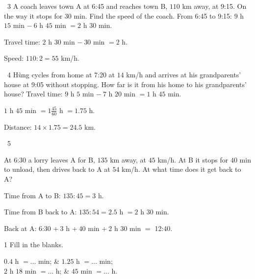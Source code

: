 \gap
\begin{exbox}{\ExWord\ 3}
A coach leaves town A at 6:45 and reaches town B, $110$ km away, at 9:15. On the way it stops for $30$ min. Find the speed of the coach.
\guide
From 6:45 to 9:15: $9$ h $15$ min $-\ 6$ h $45$ min $=2$ h $30$ min.\par
Travel time: $2$ h $30$ min $-\ 30$ min $=2$ h.\par
Speed: $110:2=55$ km/h.
\end{exbox}
\gap
\begin{exbox}{\ExWord\ 4}
Hùng cycles from home at 7:20 at $14$ km/h and arrives at his grandparents' house at 9:05 without stopping. How far is it from his home to his grandparents' house?
\guide
Travel time: $9$ h $5$ min $-\ 7$ h $20$ min $=1$ h $45$ min.\par
$1$ h $45$ min $=1\frac{45}{60}$ h $=1.75$ h.\par
Distance: $14\times1.75=24.5$ km.
\end{exbox}
\gap
\begin{exbox}{\ExWord\ 5}
\begin{minipage}[t]{0.56\linewidth}
At 6:30 a lorry leaves A for B, $135$ km away, at $45$ km/h. At B it stops for $40$ min to unload, then drives back to A at $54$ km/h. At what time does it get back to A?
\end{minipage}\hfill
\begin{minipage}[t]{0.4\linewidth}\vspace{2pt}\centering
{}
\end{minipage}
\guide
Time from A to B: $135:45=3$ h.\par
Time from B back to A: $135:54=2.5$ h $=2$ h $30$ min.\par
Back at A: 6:30 $+\ 3$ h $+\ 40$ min $+\ 2$ h $30$ min $=$ 12:40.
\end{exbox}
\begin{probbox}{1}{\relax}
Fill in the blanks.
\begin{cols2}
 $0.4$ h $=\dots$ min; &  $1.25$ h $=\dots$ min;\\
 $2$ h $18$ min $=\dots$ h; &  $45$ min $=\dots$ h.
\end{cols2}
\end{probbox}
